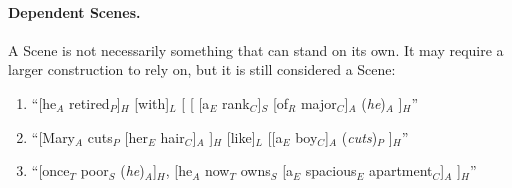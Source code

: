 \documentclass[11pt]{article}
\newcommand{\be}{\begin{enumerate}}
\newcommand{\ee}{\end{enumerate}}
\newcommand{\dd}[1]{{\color{blue}{#1}}}
\newcommand{\rem}[1]{{(\it #1})}
\begin{document}





\paragraph{Dependent Scenes.}
A Scene is not necessarily something that can stand on its own. It may require
a larger construction to rely on, but it is still considered a Scene:
\be
\item
``[he$_A$ retired$_P$]$_H$ [with]$_L$ [ [ [a$_E$ rank$_C$]$_S$ [of$_R$ major$_C$]$_A$ \rem{he}$_A$ ]$_H$''
\item
``[Mary$_A$ cuts$_P$ [her$_E$ hair$_C$]$_A$ ]$_H$ [like]$_L$ [[a$_E$ boy$_C$]$_A$ \rem{cuts}$_P$ ]$_H$''
\item
``[once$_T$ poor$_S$ \rem{he}$_A$]$_H$, [he$_A$ now$_T$ owns$_S$ [a$_E$ spacious$_E$ apartment$_C$]$_A$ ]$_H$''
\ee
\end{document}
